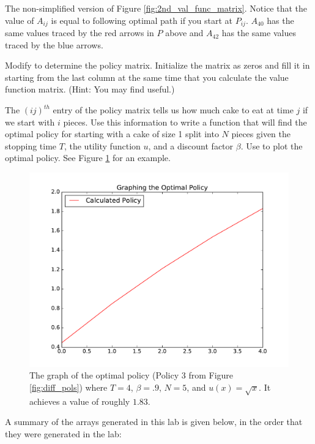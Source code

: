 The non-simplified version of Figure \ref{fig:2nd_val_func_matrix}. Notice that the value of $A_{ij}$ is equal to following optimal path if you start at $P_{ij}$.
$A_{40}$ has the same values traced by the red arrows in $P$ above and $A_{42}$ has the same values traced by the blue arrows.

\begin{problem}
Modify  to determine the policy matrix.
Initialize the matrix as zeros and fill it in starting from the last column at the same time that you calculate the value function matrix.
(Hint: You may find  useful.)
\end{problem}

\begin{problem}
The $(ij)^{th}$ entry of the policy matrix tells us how much cake to eat at time $j$ if we start with $i$ pieces.
Use this information to write a function that will find the optimal policy for starting with a cake of size 1 split into $N$ pieces given the stopping time $T$, the utility function $u$, and a discount factor $\beta$. Use  to plot the optimal policy.
See Figure \ref{fig:optimal_policy_graph} for an example.
\end{problem}

\begin{figure}[H]
\includegraphics[width=.7\textwidth]{figures/optimal_policy_graph.pdf}
\caption{The graph of the optimal policy (Policy 3 from Figure \ref{fig:diff_pols}) where $T=4$, $\beta=.9$, $N=5$, and $u(x) = \sqrt{x}$. It achieves a value of roughly $1.83$.}
\label{fig:optimal_policy_graph}
\end{figure}

A summary of the arrays generated in this lab is given below, in the order that they were generated in the lab:

